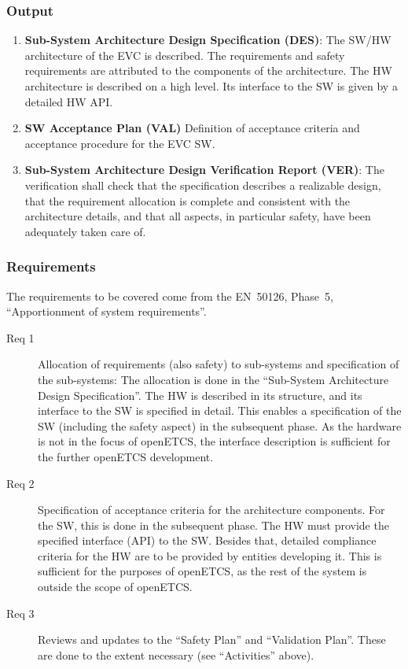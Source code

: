 \documentclass{template/openetcs_article}
\begin{document}
\subsubsection{Output}
\label{sec:2-output}

\begin{enumerate}
\item \textbf{Sub-System Architecture Design Specification (DES)}:  The SW/HW
  architecture of the EVC is described. The requirements and safety requirements are
  attributed to the components of the architecture. The HW
  architecture is described on a high level. Its interface to the SW
  is given by a detailed HW API. 
\item \textbf{SW Acceptance Plan (VAL)} Definition of acceptance criteria and
  acceptance procedure for the EVC SW.  
\item \textbf{Sub-System Architecture Design Verification Report (VER)}: The
  verification shall check that the specification describes a
  realizable design, that the requirement allocation is complete
  and consistent with the architecture details, and that all aspects,
  in particular safety, have been adequately taken care of.
\end{enumerate}

\subsubsection{Requirements}
\label{sec:2-requirements}

The requirements to be covered come from the EN~50126, Phase~5,
``Apportionment of system requirements''.
\begin{description}
\item[Req 1] Allocation of requirements (also safety) to sub-systems
  and specification of the sub-systems: The allocation is done in the
  ``Sub-System Architecture Design Specification''. The HW is
  described in its structure, and its interface to the SW is specified
  in detail. This enables a specification of the SW (including the
  safety aspect) in the subsequent phase. As the hardware is not in
  the focus of openETCS, the interface description is sufficient for
  the further openETCS development.
\item[Req 2] Specification of acceptance criteria for the architecture
  components. For the SW, this is done in the subsequent phase. The HW
  must provide the specified interface (API) to the SW. Besides that,
  detailed compliance criteria for the HW are to be provided by
  entities developing it. This is sufficient for the purposes of
  openETCS, as the rest of the system is outside the scope of
  openETCS.
\item[Req 3] Reviews and updates to the ``Safety Plan'' and
  ``Validation Plan''. These are done to the extent necessary
  (see ``Activities'' above). 
  \end{description}
\end{document}
